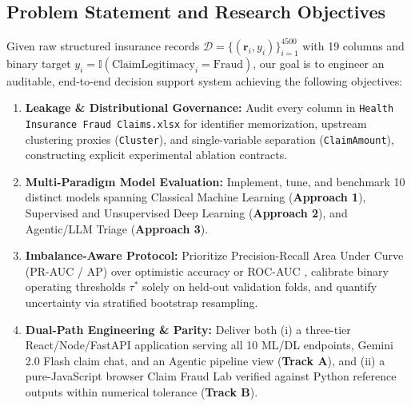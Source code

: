 \documentclass[12pt]{article}
\begin{document}
\subsection{Problem Statement and Research Objectives}
Given raw structured insurance records $\mathcal{D} = \{(\mathbf{r}_i, y_i)\}_{i=1}^{4500}$ with 19 columns and binary target $y_i = \mathbb{I}(\text{ClaimLegitimacy}_i = \text{Fraud})$, our goal is to engineer an auditable, end-to-end decision support system achieving the following objectives:
\begin{enumerate}[label=\arabic*.]
    \item \textbf{Leakage & Distributional Governance:} Audit every column in \texttt{Health Insurance Fraud Claims.xlsx} for identifier memorization, upstream clustering proxies (\texttt{Cluster}), and single-variable separation (\texttt{ClaimAmount}), constructing explicit experimental ablation contracts.
    \item \textbf{Multi-Paradigm Model Evaluation:} Implement, tune, and benchmark 10 distinct models spanning Classical Machine Learning (\textbf{Approach 1}), Supervised and Unsupervised Deep Learning (\textbf{Approach 2}), and Agentic/LLM Triage (\textbf{Approach 3}).
    \item \textbf{Imbalance-Aware Protocol:} Prioritize Precision-Recall Area Under Curve (PR-AUC / AP) over optimistic accuracy or ROC-AUC \cite{saito2015precision}, calibrate binary operating thresholds $\tau^*$ solely on held-out validation folds, and quantify uncertainty via stratified bootstrap resampling.
    \item \textbf{Dual-Path Engineering & Parity:} Deliver both (i) a three-tier React/Node/FastAPI application serving all 10 ML/DL endpoints, Gemini 2.0 Flash claim chat, and an Agentic pipeline view (\textbf{Track A}), and (ii) a pure-JavaScript browser Claim Fraud Lab verified against Python reference outputs within numerical tolerance (\textbf{Track B}).
\end{enumerate}
\end{document}
